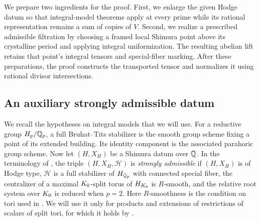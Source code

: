 We prepare two ingredients for the proof. First, we enlarge the given
Hodge datum so that integral-model theorems apply at every prime while
its rational representation remains a sum of copies of \(V\).
Second, we realize a prescribed admissible filtration by choosing a
framed local Shimura point above its crystalline period and applying
integral uniformization.  The resulting abelian lift retains that
point's integral tensors and special-fiber marking.  After these
preparations, the proof constructs the transported tensor and normalizes
it using rational divisor intersections.

\subsection{An auxiliary strongly admissible datum}

We recall the hypotheses on integral models that we will use.
For a reductive group \(H_p/\mathbb Q_p\), a full Bruhat--Tits stabilizer
is the smooth group scheme fixing a point of its extended building.
Its identity component is the associated parahoric group scheme.
Now let \((H,X_H)\) be a Shimura datum over \(\mathbb Q\). In the terminology
of \cite[Definition~2.1.6]{KisinZhou2025}, the triple
\((H,X_H,\mathcal H)\) is \emph{strongly admissible} if \((H,X_H)\)
is of Hodge type, \(\mathcal H\) is a full stabilizer of \(H_{\mathbb Q_p}\)
with connected special fiber, the centralizer of a maximal
\(K_0\)-split torus of \(H_{K_0}\) is \(R\)-smooth, and the
relative root system over \(K_0\) is reduced when \(p=2\).  Here $R$-smoothness is the condition on tori used in
\cite[\S2.4]{KisinZhouEarlier}.  We will use it only for products and
extensions of restrictions of scalars of split tori, for which it
holds by \cite[Proposition~2.4.6]{KisinZhouEarlier}.

